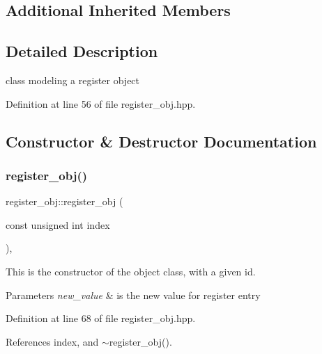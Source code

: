 \subsection*{Additional Inherited Members}


\subsection{Detailed Description}
class modeling a register object 

Definition at line 56 of file register\+\_\+obj.\+hpp.



\subsection{Constructor \& Destructor Documentation}
\mbox{\label{classregister__obj_a8e082a6770bec3bc9b8c7708f83f0700}} 
\subsubsection{\texorpdfstring{register\+\_\+obj()}{register\_obj()}}
{\footnotesize\ttfamily register\+\_\+obj\+::register\+\_\+obj (\begin{DoxyParamCaption}\item[{const unsigned int}]{index }\end{DoxyParamCaption})\hspace{0.3cm}{\ttfamily [inline]}, {\ttfamily [explicit]}}



This is the constructor of the object class, with a given id. 


\begin{DoxyParams}{Parameters}
{\em new\+\_\+value} & is the new value for register entry \\
\hline
\end{DoxyParams}


Definition at line 68 of file register\+\_\+obj.\+hpp.



References index, and $\sim$register\+\_\+obj().

